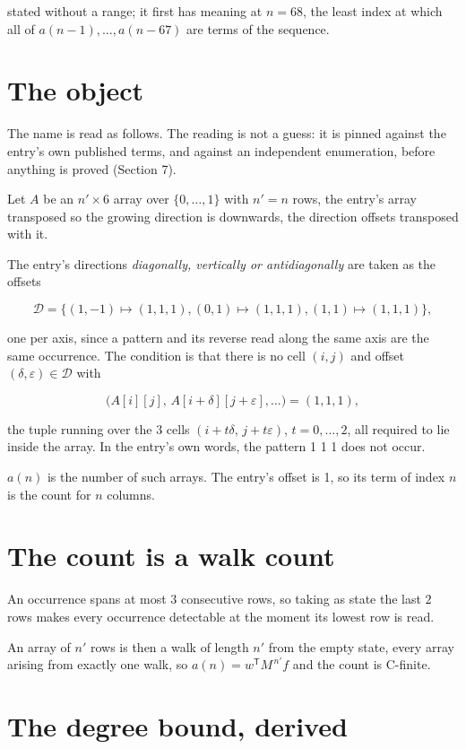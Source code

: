\documentclass[11pt]{article}
\theoremstyle{definition}
\begin{document}
stated without a range; it first has meaning at $n = 68$, the least index at which all of $a(n-1),\dots,a(n-67)$ are terms of the sequence.

\section{The object}

The name is read as follows. The reading is not a guess: it is pinned against the entry's own published terms, and against an independent enumeration, before anything is proved (Section 7).

Let $A$ be an $n' \times 6$ array over $\{0,\dots,1\}$ with $n' = n$ rows, the entry's array transposed so the growing direction is downwards, the direction offsets transposed with it.

The entry's directions {\itshape diagonally, vertically or antidiagonally} are taken as the offsets

\[\mathcal{D} = \{(1,-1)\mapsto(1,1,1), (0,1)\mapsto(1,1,1), (1,1)\mapsto(1,1,1)\},\]

one per axis, since a pattern and its reverse read along the same axis are the same occurrence. The condition is that there is no cell $(i,j)$ and offset $(\delta,\varepsilon)\in\mathcal{D}$ with

\[\bigl(A[i][j],\,A[i{+}\delta][j{+}\varepsilon],\dots\bigr) = (1, 1, 1),\]

the tuple running over the $3$ cells $(i+t\delta,\,j+t\varepsilon)$, $t = 0,\dots,2$, all required to lie inside the array. In the entry's own words, the pattern 1 1 1 does not occur.

$a(n)$ is the number of such arrays. The entry's offset is 1, so its term of index $n$ is the count for $n$ columns.

\section{The count is a walk count}

An occurrence spans at most $3$ consecutive rows, so taking as state the last $2$ rows makes every occurrence detectable at the moment its lowest row is read.

An array of $n'$ rows is then a walk of length $n'$ from the empty state, every array arising from exactly one walk, so $a(n) = w^{\mathsf T}M^{\,n'}f$ and the count is C-finite.

\section{The degree bound, derived}
\end{document}
